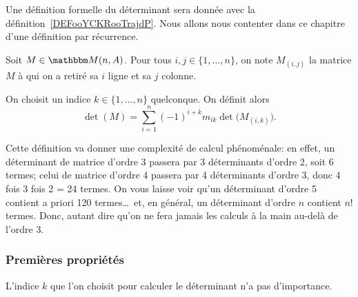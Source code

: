 Une définition formelle du déterminant sera donnée avec la définition~\ref{DEFooYCKRooTrajdP}. Nous allons nous contenter dans ce chapitre d'une définition par récurrence.

\begin{definition}
  Soit \( M \in \eM(n,A) \). Pour tous \( i,j \in \{1,\dots,n \} \), on note \( M_{(i,j)} \) la matrice  \( M \) à qui on a retiré sa \( i \)\ieme{} ligne et sa \( j \) \ieme colonne.
  
  On choisit un indice \( k \in \{1,\dots,n \} \) quelconque. On définit alors
  \begin{equation}
    \det(M) = \sum_{i = 1}^n (-1)^{i+k} m_{ik} \det\bigl(M_{(i,k)}\bigr).
  \end{equation}
\end{definition}

Cette définition va donner une complexité de calcul phénoménale: en effet, un déterminant de matrice d'ordre 3 passera par 3 déterminants d'ordre 2, soit 6 termes; celui de matrice d'ordre 4 passera par 4 déterminants d'ordre 3, donc 4 fois 3 fois 2 = 24 termes. On vous laisse voir qu'un déterminant d'ordre 5 contient a priori 120 termes\dots\ et, en général, un déterminant d'ordre \( n \) contient \( n! \) termes. Donc, autant dire qu'on ne fera jamais les calculs à la main au-delà de l'ordre 3.

\subsubsection{Premières propriétés}

\begin{lemma}
  L'indice \( k \) que l'on choisit pour calculer le déterminant n'a pas d'importance.
\end{lemma}

